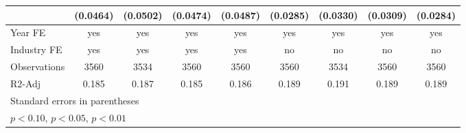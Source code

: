 \begin{table}[htbp]
\begin{tabular}{l*{8}{c}}
                    &    (0.0464)         &    (0.0502)         &    (0.0474)         &    (0.0487)         &    (0.0285)         &    (0.0330)         &    (0.0309)         &    (0.0284)         \\
\hline
Year FE             &         yes         &         yes         &         yes         &         yes         &         yes         &         yes         &         yes         &         yes         \\
Industry FE         &         yes         &         yes         &         yes         &         yes         &          no         &          no         &          no         &          no         \\
Observations        &        3560         &        3534         &        3560         &        3560         &        3560         &        3534         &        3560         &        3560         \\
R2-Adj              &       0.185         &       0.187         &       0.185         &       0.186         &       0.189         &       0.191         &       0.189         &       0.189         \\
\hline\hline
\multicolumn{9}{l}{\footnotesize Standard errors in parentheses}\\
\multicolumn{9}{l}{\footnotesize \sym{*} \(p<0.10\), \sym{**} \(p<0.05\), \sym{***} \(p<0.01\)}\\
\end{tabular}
\end{table}
